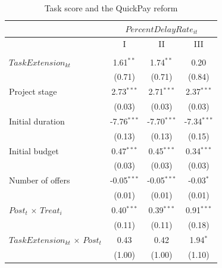 \documentclass[
]{article}
\begin{document}
\begin{table}[htbp]
   \caption{Task score and the QuickPay reform}
   \centering
   \small
   \begin{tabular}{lccc}
      \toprule
      \midrule  & \multicolumn{3}{c}{$PercentDelayRate_{it}$}\\
      \midrule  & I & II & III\\
      \midrule \\
      $TaskExtension_{kt}$                                        & 1.61$^{**}$   & 1.74$^{**}$   & 0.20\\   
                                                                  & (0.71)        & (0.71)        & (0.84)\\   
      Project stage                                               & 2.73$^{***}$  & 2.71$^{***}$  & 2.37$^{***}$\\   
                                                                  & (0.03)        & (0.03)        & (0.03)\\   
      Initial duration                                            & -7.76$^{***}$ & -7.70$^{***}$ & -7.34$^{***}$\\   
                                                                  & (0.13)        & (0.13)        & (0.15)\\   
      Initial budget                                              & 0.47$^{***}$  & 0.45$^{***}$  & 0.34$^{***}$\\   
                                                                  & (0.03)        & (0.03)        & (0.03)\\   
      Number of offers                                            & -0.05$^{***}$ & -0.05$^{***}$ & -0.03$^{*}$\\   
                                                                  & (0.01)        & (0.01)        & (0.01)\\   
      $Post_t$ $\times$ $Treat_i$                                 & 0.40$^{***}$  & 0.39$^{***}$  & 0.91$^{***}$\\   
                                                                  & (0.11)        & (0.11)        & (0.18)\\   
      $TaskExtension_{kt}$ $\times$ $Post_t$                      & 0.43          & 0.42          & 1.94$^{*}$\\   
                                                                  & (1.00)        & (1.00)        & (1.10)\\   

\end{tabular}
\end{table}
\end{document}
